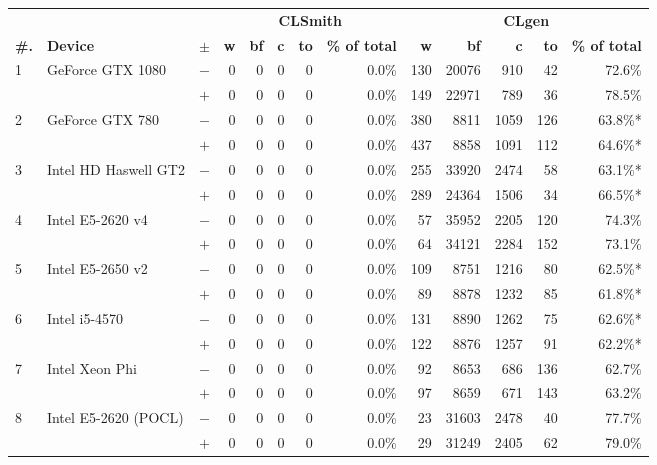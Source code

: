   \begin{tabular}{lll | rrrrr | rrrrr }
  \toprule
  & & & \multicolumn{5}{c|}{\textbf{CLSmith}} & \multicolumn{5}{c}{\textbf{CLgen}} \\
  \textbf{\#.} & \textbf{Device} & $\pm$ &
  \textbf{w} & \textbf{bf} & \textbf{c} & \textbf{to} & \textbf{\% of total} &
  \textbf{w} & \textbf{bf} & \textbf{c} & \textbf{to} & \textbf{\% of total} \\
  \midrule
  \multirow{ 2}{*}{1} & \multirow{ 2}{*}{GeForce GTX 1080} & $-$ & 0 & 0 & 0 & 0 & 0.0\%       & 130 & 20076 & 910 & 42 & 72.6\% \\& & $+$ & 0 & 0 & 0 & 0 & 0.0\% & 149 & 22971 & 789 & 36 & 78.5\% \\
\hline
\multirow{ 2}{*}{2} & \multirow{ 2}{*}{GeForce GTX 780} & $-$ & 0 & 0 & 0 & 0 & 0.0\%       & 380 & 8811 & 1059 & 126 & 63.8\%* \\& & $+$ & 0 & 0 & 0 & 0 & 0.0\% & 437 & 8858 & 1091 & 112 & 64.6\%* \\
\hline
\multirow{ 2}{*}{3} & \multirow{ 2}{*}{Intel HD Haswell GT2} & $-$ & 0 & 0 & 0 & 0 & 0.0\%       & 255 & 33920 & 2474 & 58 & 63.1\%* \\& & $+$ & 0 & 0 & 0 & 0 & 0.0\% & 289 & 24364 & 1506 & 34 & 66.5\%* \\
\hline
\multirow{ 2}{*}{4} & \multirow{ 2}{*}{Intel E5-2620 v4} & $-$ & 0 & 0 & 0 & 0 & 0.0\%       & 57 & 35952 & 2205 & 120 & 74.3\% \\& & $+$ & 0 & 0 & 0 & 0 & 0.0\% & 64 & 34121 & 2284 & 152 & 73.1\% \\
\hline
\multirow{ 2}{*}{5} & \multirow{ 2}{*}{Intel E5-2650 v2} & $-$ & 0 & 0 & 0 & 0 & 0.0\%       & 109 & 8751 & 1216 & 80 & 62.5\%* \\& & $+$ & 0 & 0 & 0 & 0 & 0.0\% & 89 & 8878 & 1232 & 85 & 61.8\%* \\
\hline
\multirow{ 2}{*}{6} & \multirow{ 2}{*}{Intel i5-4570} & $-$ & 0 & 0 & 0 & 0 & 0.0\%       & 131 & 8890 & 1262 & 75 & 62.6\%* \\& & $+$ & 0 & 0 & 0 & 0 & 0.0\% & 122 & 8876 & 1257 & 91 & 62.2\%* \\
\hline
\multirow{ 2}{*}{7} & \multirow{ 2}{*}{Intel Xeon Phi} & $-$ & 0 & 0 & 0 & 0 & 0.0\%       & 92 & 8653 & 686 & 136 & 62.7\% \\& & $+$ & 0 & 0 & 0 & 0 & 0.0\% & 97 & 8659 & 671 & 143 & 63.2\% \\
\hline
\multirow{ 2}{*}{8} & \multirow{ 2}{*}{Intel E5-2620 (POCL)} & $-$ & 0 & 0 & 0 & 0 & 0.0\%       & 23 & 31603 & 2478 & 40 & 77.7\% \\& & $+$ & 0 & 0 & 0 & 0 & 0.0\% & 29 & 31249 & 2405 & 62 & 79.0\% \\

\end{tabular}
